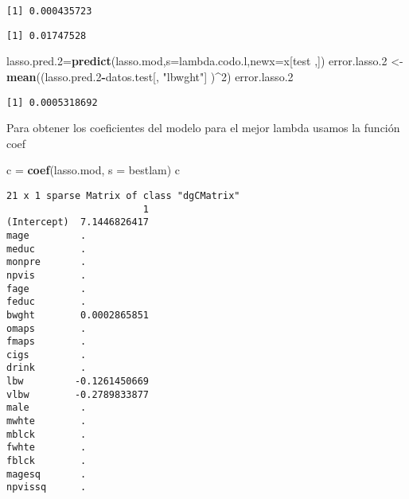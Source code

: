 \documentclass[]{article}
\newenvironment{Shaded}{\begin{snugshade}}{\end{snugshade}}
\newcommand{\KeywordTok}[1]{\textcolor[rgb]{0.13,0.29,0.53}{\textbf{#1}}}
\newcommand{\DataTypeTok}[1]{\textcolor[rgb]{0.13,0.29,0.53}{#1}}
\newcommand{\DecValTok}[1]{\textcolor[rgb]{0.00,0.00,0.81}{#1}}
\newcommand{\StringTok}[1]{\textcolor[rgb]{0.31,0.60,0.02}{#1}}
\newcommand{\CommentTok}[1]{\textcolor[rgb]{0.56,0.35,0.01}{\textit{#1}}}
\newcommand{\OperatorTok}[1]{\textcolor[rgb]{0.81,0.36,0.00}{\textbf{#1}}}
\newcommand{\NormalTok}[1]{#1}
\begin{document}
\begin{verbatim}
[1] 0.000435723
\end{verbatim}

\begin{Shaded}
\end{Shaded}

\begin{verbatim}
[1] 0.01747528
\end{verbatim}

\begin{Shaded}
\begin{Highlighting}[]
\NormalTok{lasso.pred.}\DecValTok{2}\NormalTok{=}\KeywordTok{predict}\NormalTok{(lasso.mod,}\DataTypeTok{s=}\NormalTok{lambda.codo.l,}\DataTypeTok{newx=}\NormalTok{x[test ,])}
\NormalTok{error.lasso.}\DecValTok{2}\NormalTok{ <-}\StringTok{ }\KeywordTok{mean}\NormalTok{((lasso.pred.}\DecValTok{2}\OperatorTok{-}\NormalTok{datos.test[, }\StringTok{"lbwght"}\NormalTok{] )}\OperatorTok{^}\DecValTok{2}\NormalTok{)}
\NormalTok{error.lasso.}\DecValTok{2}
\end{Highlighting}
\end{Shaded}

\begin{verbatim}
[1] 0.0005318692
\end{verbatim}

Para obtener los coeficientes del modelo para el mejor lambda usamos la
función coef

\begin{Shaded}
\begin{Highlighting}[]
\NormalTok{c =}\StringTok{ }\KeywordTok{coef}\NormalTok{(lasso.mod, }\DataTypeTok{s =}\NormalTok{ bestlam)}
\NormalTok{c}
\end{Highlighting}
\end{Shaded}

\begin{verbatim}
21 x 1 sparse Matrix of class "dgCMatrix"
                        1
(Intercept)  7.1446826417
mage         .           
meduc        .           
monpre       .           
npvis        .           
fage         .           
feduc        .           
bwght        0.0002865851
omaps        .           
fmaps        .           
cigs         .           
drink        .           
lbw         -0.1261450669
vlbw        -0.2789833877
male         .           
mwhte        .           
mblck        .           
fwhte        .           
fblck        .           
magesq       .           
npvissq      .           
\end{verbatim}
\end{document}
